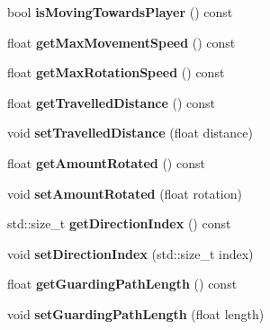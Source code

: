 \begin{DoxyCompactItemize}
\item 
\hypertarget{class_tank_abb0f52ede672bcb8cdfa1dd4a340a91b}{}bool {\bfseries is\+Moving\+Towards\+Player} () const \label{class_tank_abb0f52ede672bcb8cdfa1dd4a340a91b}

\item 
\hypertarget{class_tank_a4efa3834dc7e18840c9d42a4958c9046}{}float {\bfseries get\+Max\+Movement\+Speed} () const \label{class_tank_a4efa3834dc7e18840c9d42a4958c9046}

\item 
\hypertarget{class_tank_ae40715b4f892f914eed657cca6a2e0ff}{}float {\bfseries get\+Max\+Rotation\+Speed} () const \label{class_tank_ae40715b4f892f914eed657cca6a2e0ff}

\item 
\hypertarget{class_tank_a037ffda79506d0f1392bc83d2edd0868}{}float {\bfseries get\+Travelled\+Distance} () const \label{class_tank_a037ffda79506d0f1392bc83d2edd0868}

\item 
\hypertarget{class_tank_a35208f172dbcc8b6f8e3638231f29e5a}{}void {\bfseries set\+Travelled\+Distance} (float distance)\label{class_tank_a35208f172dbcc8b6f8e3638231f29e5a}

\item 
\hypertarget{class_tank_adf1971fd4de92ac0ba9af0e4a6660659}{}float {\bfseries get\+Amount\+Rotated} () const \label{class_tank_adf1971fd4de92ac0ba9af0e4a6660659}

\item 
\hypertarget{class_tank_a8e12f38946222c9fba1bc60190e23b53}{}void {\bfseries set\+Amount\+Rotated} (float rotation)\label{class_tank_a8e12f38946222c9fba1bc60190e23b53}

\item 
\hypertarget{class_tank_aebe2d42e18e459979cbb5e9aeb6f6430}{}std\+::size\+\_\+t {\bfseries get\+Direction\+Index} () const \label{class_tank_aebe2d42e18e459979cbb5e9aeb6f6430}

\item 
\hypertarget{class_tank_ad943e5d63eedd0eaaf942b11dcf24209}{}void {\bfseries set\+Direction\+Index} (std\+::size\+\_\+t index)\label{class_tank_ad943e5d63eedd0eaaf942b11dcf24209}

\item 
\hypertarget{class_tank_af88a2851fda437eb921c7adc84bf793d}{}float {\bfseries get\+Guarding\+Path\+Length} () const \label{class_tank_af88a2851fda437eb921c7adc84bf793d}

\item 
\hypertarget{class_tank_ab3ebae5a6177b76003792b21421cd1a8}{}void {\bfseries set\+Guarding\+Path\+Length} (float length)\label{class_tank_ab3ebae5a6177b76003792b21421cd1a8}


\end{DoxyCompactItemize}
